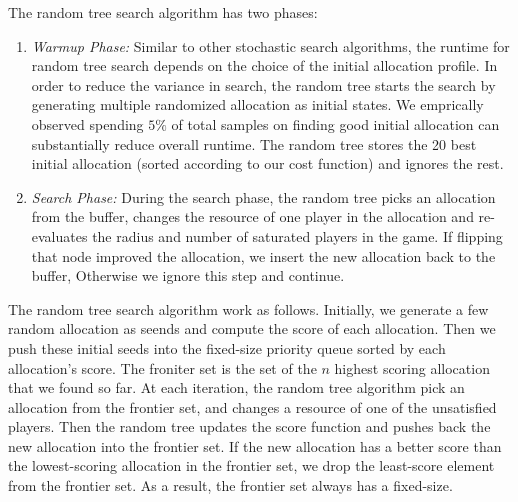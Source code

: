 The random tree search algorithm has two phases:
\begin{enumerate}
  \item \emph{Warmup Phase:} Similar to other stochastic search algorithms, the runtime for random tree search depends on the choice of the initial allocation profile. In order to reduce the variance in search, the random tree starts the search by generating multiple randomized allocation as initial states. We emprically observed spending $5\%$ of total samples on finding good initial allocation can substantially reduce overall runtime. The random tree stores the 20 best initial allocation (sorted according to our cost function) and ignores the rest.
  \item \emph{Search Phase:} During the search phase, the random tree picks an allocation from the buffer, changes the resource of one player in the allocation and re-evaluates the radius and number of saturated players in the game. If flipping that node improved the allocation, we insert the new allocation back to the buffer, Otherwise we ignore this step and continue.
\end{enumerate}

The random tree search algorithm work as follows.
Initially, we generate a few random allocation as seends and compute the score of each allocation. Then we push these initial seeds into the fixed-size priority queue sorted by each allocation's score. The froniter set is the set of the $n$ highest scoring allocation that we found so far.
At each iteration, the random tree algorithm pick an allocation from the frontier set, and changes a resource of one of the unsatisfied players. Then the random tree updates the score function and pushes back the new allocation into the frontier set.
If the new allocation has a better score than the lowest-scoring allocation in the frontier set, we drop the least-score element from the frontier set. As a result, the frontier set always has a fixed-size.

